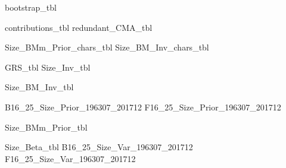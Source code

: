 



\begin{landscape}
{bootstrap_tbl}
\end{landscape}
{contributions_tbl}
{redundant_CMA_tbl}

{Size_BMm_Prior_chars_tbl}
{Size_BM_Inv_chars_tbl}

{GRS_tbl}
{Size_Inv_tbl}
\begin{landscape}
{Size_BM_Inv_tbl}
\end{landscape}
{B16_25_Size_Prior_196307_201712}
{F16_25_Size_Prior_196307_201712}
\begin{landscape}
{Size_BMm_Prior_tbl}
\end{landscape}
{Size_Beta_tbl}
{B16_25_Size_Var_196307_201712}
{F16_25_Size_Var_196307_201712}
